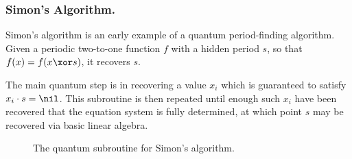     \subsubsection{Simon's Algorithm.}
      Simon's algorithm is an early example of a quantum period-finding
        algorithm. Given a periodic two-to-one function $f$ with a hidden period
        $s$, so that $f(x) = f(x \xor s)$, it recovers $s$.

      The main quantum step is in recovering a value $x_i$ which is guaranteed to
        satisfy $x_i \cdot s = \nil$. This subroutine is then repeated until enough
        such $x_i$ have been recovered that the equation system is fully determined,
        at which point $s$ may be recovered via basic linear algebra.

      \begin{figure}[h!]
   	    \begin{center}
        \end{center}
        \caption{
          \label{fig:Simon}
          The quantum subroutine for Simon's algorithm.
        }
      \end{figure}


